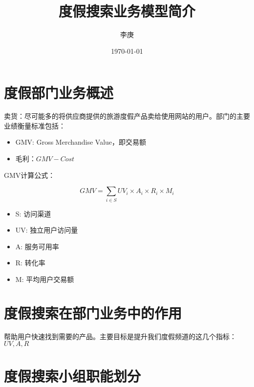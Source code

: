 \documentclass{article}
\begin{document}
\begin{CJK}{UTF8}{gbsn}

\title{度假搜索业务模型简介}
\author{李庚}
\date{\today}



\maketitle
\tableofcontents

\section{度假部门业务概述}

卖货：尽可能多的将供应商提供的旅游度假产品卖给使用网站的用户。部门的主要业绩衡量标准包括：

\begin{itemize}
  \item { GMV: Gross Merchandise Value，即交易额 }
  \item { 毛利：$GMV - Cost$ }
\end{itemize}


GMV计算公式：

\begin{equation}
  GMV = \sum_{i \in S}{UV_i \times A_i \times R_i \times M_i}
\end{equation}

\begin{itemize}
  \item { S: 访问渠道 }
  \item { UV: 独立用户访问量 }
  \item { A: 服务可用率 }
  \item { R: 转化率 }
  \item { M: 平均用户交易额 }
\end{itemize}
    

\section{度假搜索在部门业务中的作用}

帮助用户快速找到需要的产品。主要目标是提升我们度假频道的这几个指标：$ UV, A, R $

\section{度假搜索小组职能划分}





\clearpage
\end{CJK}
\end{document}
